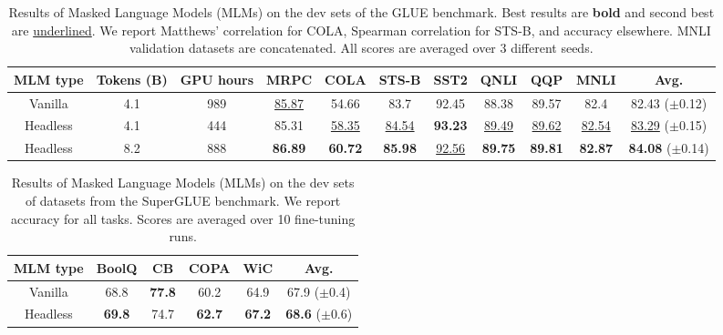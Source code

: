 \begin{table}
\scriptsize \centering
\begin{tabular}{@{}ccc|cccccccc@{}}
\toprule
MLM type        & Tokens (B) & GPU hours & MRPC                        & COLA                        & STS-B                      & SST2                        & QNLI                        & QQP                         & MNLI                        & \textbf{Avg.} \\ \midrule
Vanilla  &4.1& 989& \underline{85.87}          & 54.66          & 83.7         & 92.45        & 88.38      & 89.57         & 82.4       & 82.43 \tiny{($\pm$0.12)}         \\ 
Headless &4.1& 444& 85.31                       & \underline{58.35}                       & \underline{84.54}                      & \textbf{93.23}                       & \underline{89.49}                       & \underline{89.62}                       & \underline{82.54}                       & \underline{83.29} \tiny{($\pm$0.15)}            \\ 
Headless &8.2&888& \textbf{86.89} & \textbf{60.72} & \textbf{85.98 } & \underline{92.56} & \textbf{89.75} & \textbf{89.81} & \textbf{82.87 } & \textbf{84.08} \tiny{($\pm$0.14)} \\ \bottomrule
\end{tabular}
\caption{Results of Masked Language Models (MLMs) on the dev sets of the GLUE benchmark. Best results are \textbf{bold} and second best are \underline{underlined}. We report Matthews' correlation for COLA, Spearman correlation for STS-B, and accuracy elsewhere. MNLI validation datasets are concatenated. All scores are averaged over 3 different seeds.}
\label{tab:glue_res}
\end{table}

\begin{table}
\centering
\scriptsize
\begin{tabular}{@{}c|ccccc@{}}
\toprule
MLM type & BoolQ          & CB             & COPA           & WiC            & Avg.           \\ \midrule
Vanilla  & 68.8          & \textbf{77.8} & 60.2          & 64.9          & 67.9 \tiny{($\pm$0.4)}          \\ 
Headless & \textbf{69.8} & 74.7          & \textbf{62.7} & \textbf{67.2} & \textbf{68.6} \tiny{($\pm$0.6)} \\ \bottomrule
\end{tabular}
\caption{Results of Masked Language Models (MLMs) on the dev sets of datasets from the SuperGLUE benchmark. We report accuracy for all tasks. Scores are averaged over 10 fine-tuning runs.}
\end{table}

